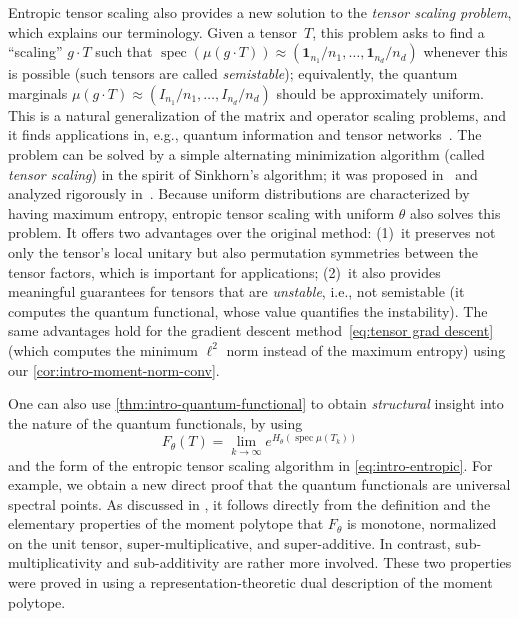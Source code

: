 \documentclass[11pt,letterpaper]{article}
\numberwithin{equation}{section}
\newcommand{\qfunc}{F}
\DeclareMathOperator{\spec}{spec}
\begin{document}
Entropic tensor scaling also provides a new solution to the \emph{tensor scaling problem}, which explains our terminology.
Given a tensor~$T$, this problem asks to find a ``scaling'' $g\cdot T$ such that $\spec(\mu(g \cdot T)) \approx (\bm{1}_{n_1}/n_1, \ldots, \bm{1}_{n_d}/n_d)$ whenever this is possible (such tensors are called \emph{semistable}); equivalently, the quantum marginals $\mu(g\cdot T)\approx(I_{n_1}/n_1, \ldots, I_{n_d}/n_d)$ should be approximately uniform.
This is a natural generalization of the matrix and operator scaling problems, and it finds applications in, e.g., quantum information and tensor networks~\cite{VDDB2003,tensor_canonical_form}.
The problem can be solved by a simple alternating minimization algorithm (called \emph{tensor scaling}) in the spirit of Sinkhorn's algorithm; it was proposed in~\cite{VDDB2003} and analyzed rigorously in~\cite{BFGOWW2018}.
Because uniform distributions are characterized by having maximum entropy, entropic tensor scaling with uniform $\theta$ also solves this problem.
It offers two advantages over the original method:
(1)~it preserves not only the tensor's local unitary but also permutation symmetries between the tensor factors, which is important for applications;
(2)~it also provides meaningful guarantees for tensors that are \emph{unstable}, i.e., not semistable (it computes the quantum functional, whose value quantifies the instability).
The same advantages hold for the gradient descent method~\eqref{eq:tensor grad descent} (which computes the minimum $\ell^2$ norm instead of the maximum entropy) using our \cref{cor:intro-moment-norm-conv}.

One can also use \cref{thm:intro-quantum-functional} to obtain \emph{structural} insight into the nature of the quantum functionals, by using
\begin{equation}\label{eq:qfunc via ets}
   \qfunc_\theta(T) = \lim_{k\rightarrow\infty} e^{H_\theta(\spec\mu(T_k))}
\end{equation}
and the form of the entropic tensor scaling algorithm in \cref{eq:intro-entropic}.
For example, we obtain a new direct proof that the quantum functionals are universal spectral points.
As discussed in \cite{CVZ2018}, it follows directly from the definition and the elementary properties of the moment polytope that $F_{\theta}$ is monotone, normalized on the unit tensor, super-multiplicative, and super-additive.
In contrast, sub-multiplicativity and sub-additivity are rather more involved.
These two properties were proved in \cite{CVZ2018} using a representation-theoretic dual description of the moment polytope.
\end{document}
